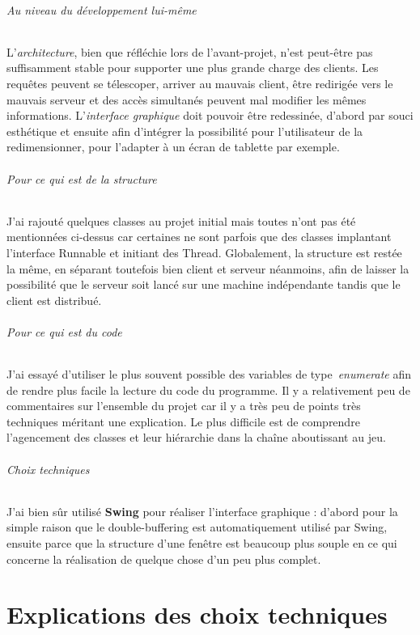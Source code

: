 \documentclass[a4paper,12pt]{report}
\begin{document}
\paragraph{Au niveau du développement lui-même}
L'\emph{architecture}, bien que réfléchie lors de l'avant-projet, n'est peut-être pas suffisamment stable pour supporter une plus grande charge des clients. Les requêtes peuvent se télescoper, arriver au mauvais client, être redirigée vers le mauvais serveur et des accès simultanés peuvent mal modifier les mêmes informations. L'\emph{interface graphique} doit pouvoir être redessinée, d'abord par souci esthétique et ensuite afin d'intégrer la possibilité pour l'utilisateur de la redimensionner, pour l'adapter à un écran de tablette par exemple.
\paragraph{Pour ce qui est de la structure}
J'ai rajouté quelques classes au projet initial mais toutes n'ont pas été mentionnées ci-dessus car certaines ne sont parfois que des classes implantant l'interface Runnable et initiant des Thread. Globalement, la structure est restée la même, en séparant toutefois bien client et serveur néanmoins, afin de laisser la possibilité que le serveur soit lancé sur une machine indépendante tandis que le client est distribué.
\paragraph{Pour ce qui est du code}
J'ai essayé d'utiliser le plus souvent possible des variables de type \emph{enumerate} afin de rendre plus facile la lecture du code du programme. Il y a relativement peu de commentaires sur l'ensemble du projet car il y a très peu de points très techniques méritant une explication. Le plus difficile est de comprendre l'agencement des classes et leur hiérarchie dans la chaîne aboutissant au jeu.
\paragraph{Choix techniques}
J'ai bien sûr utilisé \textbf{Swing} pour réaliser l'interface graphique : d'abord pour la simple raison que le double-buffering est automatiquement utilisé par Swing, ensuite parce que la structure d'une fenêtre est beaucoup plus souple en ce qui concerne la réalisation de quelque chose d'un peu plus complet.

\part{Explications des choix techniques}
\end{document}
